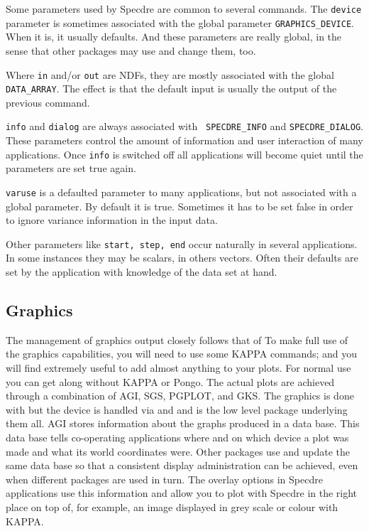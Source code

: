    Some parameters used by Specdre are common to several commands. The
   {\tt device} parameter is sometimes associated with the global
   parameter {\tt GRAPHICS\_DEVICE}. When it is, it usually
   defaults. And these parameters are really global, in the sense that
   other packages may use and change them, too.

   Where {\tt in} and/or {\tt out} are NDFs, they are mostly associated
   with the global {\tt DATA\_ARRAY}. The effect is that the default
   input is usually the output of the previous command.

   {\tt info} and {\tt dialog} are always associated with {\tt
   SPECDRE\_INFO} and {\tt SPECDRE\_DIALOG}. These parameters control
   the amount of information and user interaction of many applications.
   Once {\tt info} is switched off all applications will become quiet
   until the parameters are set true again.

   {\tt varuse} is a defaulted parameter to many applications, but not
   associated with a global parameter. By default it is true. Sometimes
   it has to be set false in order to ignore variance information in the
   input data.

   Other parameters like {\tt start, step, end} occur naturally in
   several applications. In some instances they may be scalars, in
   others vectors. Often their defaults are set by the application with
   knowledge of the data set at hand.


\subsection{\label{specdregraphics}Graphics}

   The management of graphics output closely follows that of
   To make full use of the graphics capabilities, you will need to use
   some KAPPA commands; and you will find
   extremely useful to add almost anything to your plots.  For normal
   use you can get along without KAPPA or Pongo. The actual plots are
   achieved through a combination of AGI, SGS, PGPLOT, and GKS.
   The graphics is done with
   but the device is handled via
   and
   and
   is the low level package underlying them all.  AGI stores information
   about the graphs produced in a data base.  This data base tells
   co-operating applications where and on which device a plot was made and
   what its world coordinates were.  Other packages use and update the
   same data base so that a consistent display administration can be
   achieved, even when different packages are used in turn. The overlay
   options in Specdre applications use this information and allow you to
   plot with Specdre in the right place on top of, for example, an image
   displayed in grey scale or colour with KAPPA.

